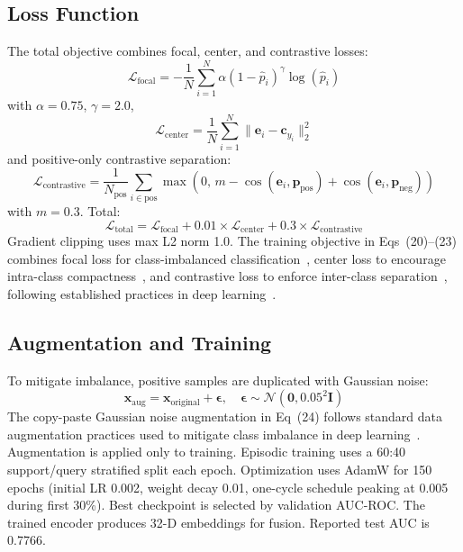 \documentclass[10pt,letterpaper]{article}
\begin{document}
\subsection*{Loss Function}
The total objective combines focal, center, and contrastive losses:
\begin{equation}
\mathcal{L}_{\text{focal}} = -\frac{1}{N}\sum_{i=1}^{N}\alpha(1-\hat{p}_i)^\gamma \log(\hat{p}_i)
\end{equation}
with $\alpha=0.75$, $\gamma=2.0$,
\begin{equation}
\mathcal{L}_{\text{center}} = \frac{1}{N}\sum_{i=1}^{N}\|\mathbf{e}_i - \mathbf{c}_{y_i}\|_2^2
\end{equation}
and positive-only contrastive separation:
\begin{equation}
\mathcal{L}_{\text{contrastive}}=\frac{1}{N_{\text{pos}}}\sum_{i\in \text{pos}}
\max\left(0,\, m-\cos(\mathbf{e}_i,\mathbf{p}_{\text{pos}})+\cos(\mathbf{e}_i,\mathbf{p}_{\text{neg}})\right)
\end{equation}
with $m=0.3$. Total:
\begin{equation}
\mathcal{L}_{\text{total}}=
\mathcal{L}_{\text{focal}} + 0.01\times\mathcal{L}_{\text{center}} + 0.3\times\mathcal{L}_{\text{contrastive}}
\end{equation}
Gradient clipping uses max L2 norm 1.0. 
The training objective in Eqs~(20)--(23) combines focal loss for class-imbalanced classification~\cite{ref53}, center loss to encourage intra-class compactness~\cite{ref54}, and contrastive loss to enforce inter-class separation~\cite{ref55}, following established practices in deep learning~\cite{ref50}.

\subsection*{Augmentation and Training}
To mitigate imbalance, positive samples are duplicated with Gaussian noise:
\begin{equation}
\mathbf{x}_{\text{aug}} = \mathbf{x}_{\text{original}} + \boldsymbol{\epsilon},\quad
\boldsymbol{\epsilon}\sim \mathcal{N}(\mathbf{0},0.05^2\mathbf{I})
\end{equation}
The copy-paste Gaussian noise augmentation in Eq~(24) follows standard data augmentation practices used to mitigate class imbalance in deep learning~\cite{ref56}. Augmentation is applied only to training. Episodic training uses a 60:40 support/query stratified split each epoch. Optimization uses AdamW for 150 epochs (initial LR 0.002, weight decay 0.01, one-cycle schedule peaking at 0.005 during first 30\%). Best checkpoint is selected by validation AUC-ROC. The trained encoder produces 32-D embeddings for fusion. Reported test AUC is 0.7766.
\end{document}
